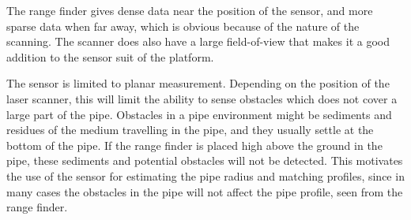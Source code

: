 The range finder gives dense data near the position of the sensor, and more sparse data
when far away, which is obvious because of the nature of the scanning. The scanner does
also have a large field-of-view that makes it a good addition to the sensor suit of the
platform. 

The sensor is limited to planar measurement. Depending on the position of the laser
scanner, this will limit the ability to sense obstacles which does not cover a large part 
of the pipe. Obstacles in a pipe environment might be sediments and residues of the medium
travelling in the pipe, and they usually settle at the bottom of the pipe. If the range
finder is placed high above the ground in the pipe, these sediments and potential
obstacles will not be detected. This motivates the use of the sensor for estimating the
pipe radius and matching profiles, since in many cases the obstacles in the pipe will not
affect the pipe profile, seen from the range finder. 


